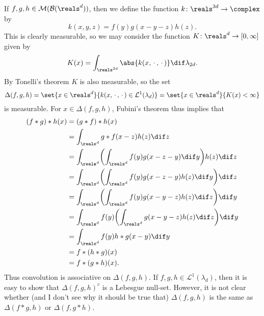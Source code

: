 \documentclass[article, a4paper, 11pt, oneside]{memoir}
\numberwithin{equation}{chapter}
\newcommand{\calM}{\mathcal{M}}
\newcommand{\calL}{\mathcal{L}}
\newcommand{\borel}{\mathcal{B}}
\theoremstyle{nonumberplain}
\begin{document}
\begin{remarkbreak}
	If $f,g,h \in \calM(\borel(\reals^d))$, then we define the function $k \colon \reals^{3d} \to \complex$ by
	\begin{equation*}
		k(x,y,z)
			= f(y) g(x-y-z) h(z).
	\end{equation*}
	This is clearly measurable, so we may consider the function $K \colon \reals^d \to [0,\infty]$ given by
	\begin{equation*}
		K(x)
			= \int_{\reals^{2d}} \abs{k(x,\,\cdot\,,\,\cdot\,)} \dif \lambda_{2d}.
	\end{equation*}
	By Tonelli's theorem $K$ is also measurable, so the set
	\begin{equation*}
		\Delta(f,g,h)
			= \set{x \in \reals^d }{ k(x,\,\cdot\,,\,\cdot\,) \in \calL^1(\lambda_d) }
			= \set{x \in \reals^d }{ K(x) < \infty }
	\end{equation*}
	is measurable. For $x \in \Delta(f,g,h)$, Fubini's theorem thus implies that
	\begin{align*}
		(f * g) * h(x)
			&= (g * f) * h(x) \\
			&= \int_{\reals^d} g * f(x-z) h(z) \dif z \\
			&= \int_{\reals^d} \biggl( \int_{\reals^d} f(y) g(x-z-y) \dif y \biggr) h(z) \dif z \\
			&= \int_{\reals^d} \biggl( \int_{\reals^d} f(y) g(x-z-y) h(z) \dif y \biggr) \dif z \\
			&= \int_{\reals^d} \biggl( \int_{\reals^d} f(y) g(x-y-z) h(z) \dif z \biggr) \dif y \\
			&= \int_{\reals^d} f(y) \biggl( \int_{\reals^d} g(x-y-z) h(z) \dif z \biggr) \dif y \\
			&= \int_{\reals^d} f(y) h * g(x-y) \dif y \\
			&= f * (h * g)(x) \\
			&= f * (g * h)(x).
	\end{align*}
	Thus convolution is associative on $\Delta(f,g,h)$. If $f,g,h \in \calL^1(\lambda_d)$, then it is easy to show that $\Delta(f,g,h)^c$ is a Lebesgue null-set. However, it is not clear whether (and I don't see why it should be true that) $\Delta(f,g,h)$ is the same as $\Delta(f*g,h)$ or $\Delta(f,g*h)$.
\end{remarkbreak}
\end{document}
